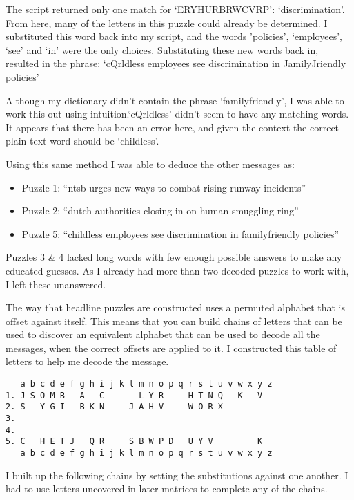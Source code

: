 \documentclass[11pt,a4paper,twoside]{article}
\begin{document}
The script returned only one match for `ERYHURBRWCVRP': `discrimination'.  From
here, many of the letters in this puzzle could already be determined. I
substituted this word back into my script, and the words 'policies',
`employees', `see' and `in' were the only choices. Substituting these new words
back in, resulted in the phrase: `cQrldless employees see discrimination in
JamilyJriendly policies'

Although my dictionary didn't contain the phrase `familyfriendly', I was able
to work this out using intuition.`cQrldless' didn't seem to have any matching
words. It appears that there has been an error here, and given the context the
correct plain text word should be `childless'. 

Using this same method I was able to deduce the other messages as:
\begin{itemize}[noitemsep]
\item Puzzle 1: ``ntsb urges new ways to combat rising runway incidents''
\item Puzzle 2: ``dutch authorities closing in on human smuggling ring''
\item Puzzle 5: ``childless employees see discrimination in familyfriendly policies''
\end{itemize}

Puzzles 3 \& 4 lacked long words with few enough possible answers to make any
educated guesses. As I already had more than two decoded puzzles to work with,
I left these unanswered.  

The way that headline puzzles are constructed uses a permuted alphabet that is
offset against itself. This means that you can build chains of letters that can
be used to discover an equivalent alphabet that can be used to decode all the
messages, when the correct offsets are applied to it. I constructed this table
of letters to help me decode the message. 

\begin{lstlisting}
   a b c d e f g h i j k l m n o p q r s t u v w x y z
1. J S O M B   A   C       L Y R     H T N Q   K   V   
2. S   Y G I   B K N     J A H V     W O R X           
3.                                                     
4.                                                     
5. C   H E T J   Q R     S B W P D   U Y V         K   
   a b c d e f g h i j k l m n o p q r s t u v w x y z
\end{lstlisting}

I built up the following chains by setting the substitutions against one
another. I had to use letters uncovered in later matrices to complete any of
the chains. 
\end{document}
